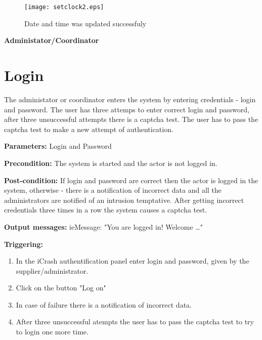 \begin{figure}[h]
    \texttt{[image: setclock2.eps]}
	\caption{Date and time was updated successfuly}
\end{figure}


\begin{center}
	{\bf \Large Administator/Coordinator}
\end{center}

\section{Login}
\label{operation:Login}

The administator or coordinator enters the system by entering credentials -
login and password.
The user has three attemps to enter correct login and password, after three
unsuccessful attempts there is a captcha test. The user has to pass the captcha
test to make a new attempt of authentication.

\begin{description}
	\item \textbf{Parameters:} Login and Password
	\item \textbf{Precondition:} The system is started and the actor is not logged
	in. 
	\item \textbf{Post-condition:} If login and password are correct then the
	actor is logged in the system, otherwise - there is a notification
	of incorrect data and all the administrators are notified of an intrusion
	temptative. After getting incorrect credentials three times in a row the
	system causes a captcha test. 
	\item \textbf{Output messages:} ieMessage: "You are logged in! Welcome
	\ldots"
	
	\item \textbf{Triggering:}
	
	\begin{enumerate}
		\item In the iCrash authentification panel enter login and password, given by
		the supplier/administrator.
		\item Click on the button "Log on"
		\item In case of failure there is a notification of incorrect data.
		\item After three unsuccessful atempts the user has to pass the captcha test
		to try to login one more time.
	\end{enumerate}
\end{description}

